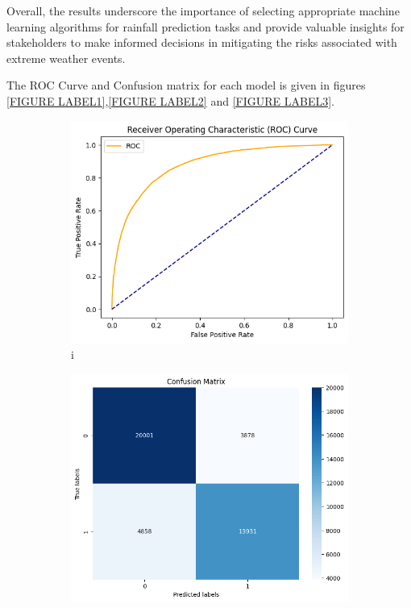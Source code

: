 \documentclass{josis}
\begin{document}
Overall, the results underscore the importance of selecting appropriate machine learning algorithms for rainfall prediction tasks and provide valuable insights for stakeholders to make informed decisions in mitigating the risks associated with extreme weather events.

The ROC Curve and Confusion matrix for each model is given in figures \ref{FIGURE LABEL1},\ref{FIGURE LABEL2} and \ref{FIGURE LABEL3}.

\begin{figure}[!h]%
\centering
\begin{subfigure}{.24\textwidth}
    \centering
    \includegraphics[width=0.95\linewidth]{ROC1.png}  
    \caption{i}
    \label{SUBFIGURE LABEL 1}
\end{subfigure}
\begin{subfigure}{.24\textwidth}
    \centering
    \includegraphics[width=0.95\linewidth]{CM1.png}  

\end{subfigure}
\end{figure}
\end{document}
